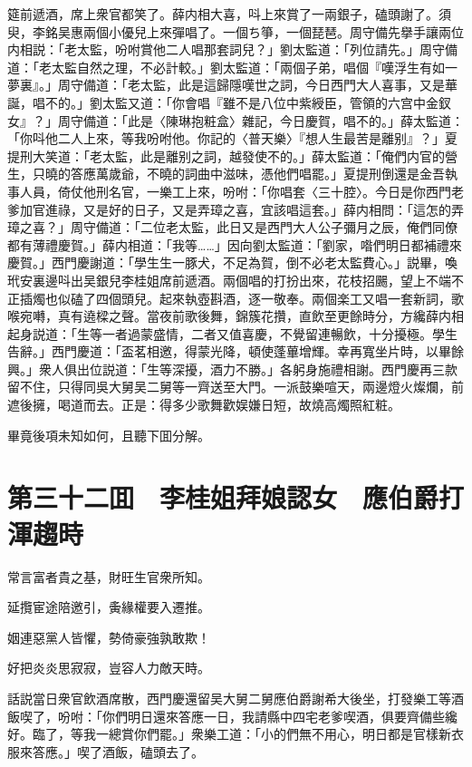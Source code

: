 筵前遞酒，席上衆官都笑了。薛内相大喜，呌上來賞了一兩銀子，磕頭謝了。須臾，李銘吴惠兩個小優兒上來彈唱了。一個ち箏，一個琵琶。周守備先擧手讓兩位内相説：「老太監，吩咐賞他二人唱那套詞兒？」劉太監道：「列位請先。」周守備道：「老太監自然之理，不必計較。」劉太監道：「兩個子弟，唱個『嘆浮生有如一夢裏』。」周守備道：「老太監，此是這歸隱嘆世之詞，今日西門大人喜事，又是華誕，唱不的。」劉太監又道：「你會唱『雖不是八位中紫綬臣，管領的六宫中金釵女』？」周守備道：「此是〈陳琳抱粧盒〉雜記，今日慶賀，唱不的。」薛太監道：「你呌他二人上來，等我吩咐他。你記的〈普天樂〉『想人生最苦是離别』？」夏提刑大笑道：「老太監，此是離别之詞，越發使不的。」薛太監道：「俺們内官的營生，只曉的答應萬歲爺，不曉的詞曲中滋味，憑他們唱罷。」夏提刑倒還是金吾執事人員，倚仗他刑名官，一樂工上來，吩咐：「你唱套〈三十腔〉。今日是你西門老爹加官進祿，又是好的日子，又是弄璋之喜，宜該唱這套。」薛内相問：「這怎的弄璋之喜？」周守備道：「二位老太監，此日又是西門大人公子彌月之辰，俺們同僚都有薄禮慶賀。」薛内相道：「我等……」因向劉太監道：「劉家，喒們明日都補禮來慶賀。」西門慶謝道：「學生生一豚犬，不足為賀，倒不必老太監費心。」説畢，喚玳安裏邊呌出吴銀兒李桂姐席前遞酒。兩個唱的打扮出來，花枝招颺，望上不端不正插燭也似磕了四個頭兒。起來執壺斟酒，逐一敬奉。兩個楽工又唱一套新詞，歌喉宛囀，真有遶樑之聲。當夜前歌後舞，錦簇花攢，直飲至更餘時分，方纔薛内相起身説道：「生等一者過蒙盛情，二者又值喜慶，不覺留連暢飲，十分擾極。學生告辭。」西門慶道：「盃茗相邀，得蒙光降，頓使蓬蓽增輝。幸再寬坐片時，以畢餘興。」衆人俱出位説道：「生等深擾，酒力不勝。」各躬身施禮相謝。西門慶再三款留不住，只得同吳大舅吴二舅等一齊送至大門。一派鼓樂喧天，兩邊燈火燦爛，前遮後擁，喝道而去。正是：得多少歌舞歡娱嫌日短，故燒高燭照紅粧。

畢竟後項未知如何，且聽下囬分解。

\chapter*{第三十二囬　李桂姐拜娘認女　應伯爵打渾趨時}

常言富者貴之基，財旺生官衆所知。

延攬宦途陪邀引，夤緣權要入遷推。

姻連惡黨人皆懼，勢倚豪強孰敢欺！

好把炎炎思寂寂，豈容人力敵天時。

話説當日衆官飲酒席散，西門慶還留吴大舅二舅應伯爵謝希大後坐，打發樂工等酒飯喫了，吩咐：「你們明日還來答應一日，我請縣中四宅老爹喫酒，俱要齊備些纔好。臨了，等我一總賞你們罷。」衆樂工道：「小的們無不用心，明日都是官樣新衣服來答應。」喫了酒飯，磕頭去了。

